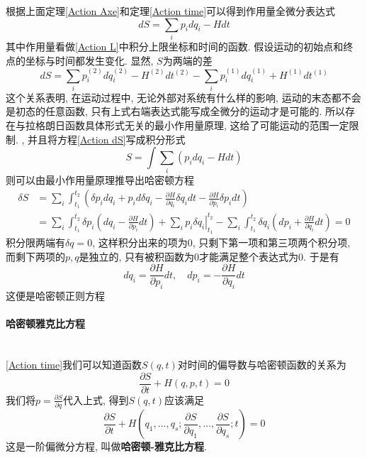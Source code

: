 \documentclass[a4paper,11pt]{article}
\theoremstyle{mystyle}
\begin{document}
根据上面定理\ref{Action Axe}和定理\ref{Action time}可以得到作用量全微分表达式
\begin{equation}\label{Action dS}
  dS=\sum_{i}p_idq_i-Hdt
\end{equation}
其中作用量看做\eqref{Action L}中积分上限坐标和时间的函数. 假设运动的初始点和终点的坐标与时间都发生变化. 显然, $S$为两端的差
\begin{equation*}
  dS=\sum_{i}p_i^{(2)}dq_i^{(2)}-H^{(2)}dt^{(2)}-\sum_{i}p_i^{(1)}dq_i^{(1)}+H^{(1)}dt^{(1)}
\end{equation*}
这个关系表明, 在运动过程中, 无论外部对系统有什么样的影响, 运动的末态都不会是初态的任意函数, 只有上式右端表达式能写成全微分的运动才是可能的. 所以存在与拉格朗日函数具体形式无关的最小作用量原理, 这给了可能运动的范围一定限制.
, 并且将方程\eqref{Action dS}写成积分形式
\begin{equation}\label{Action int}
  S=\int\sum_{i}\left(p_idq_i-Hdt\right)
\end{equation}
则可以由最小作用量原理推导出哈密顿方程
\begin{equation*}
\begin{split}
   \delta S&=\sum_{i}\int_{t_1}^{t_2}\left(\delta p_idq_i+p_id\delta q_i-\frac{\partial H}{\partial{q_i}}\delta q_idt-\frac{\partial H}{\partial p_i}\delta p_idt\right) \\
     &=\sum_{i}\int_{t_1}^{t_2}\delta p_i\left(dq_i-\frac{\partial H}{\partial{p_i}}dt\right)+\left.\sum_{i}p_i\delta q_i\right|_{t_1}^{t_2}-\sum_{i}\int_{t_1}^{t_2}\delta q_i\left(dp_i+\frac{\partial H}{\partial{q_i}}dt\right)=0
\end{split}
\end{equation*}
积分限两端有$\delta q=0$, 这样积分出来的项为$0$, 只剩下第一项和第三项两个积分项, 而剩下两项的$p,q$是独立的, 只有被积函数为$0$才能满足整个表达式为$0$. 于是有
\begin{equation*}
  dq_i=\frac{\partial H}{\partial{p_i}}dt,\quad dp_i=-\frac{\partial H}{\partial{q_i}}dt
\end{equation*}
这便是哈密顿正则方程
\paragraph*{哈密顿雅克比方程}\quad\\
\ref{Action time}我们可以知道函数$S(q,t)$对时间的偏导数与哈密顿函数的关系为
\begin{equation*}
  \frac{\partial S}{\partial t}+H(q,p,t)=0
\end{equation*}
我们将$p=\frac{\partial S}{\partial q}$代入上式, 得到$S(q,t)$应该满足
\begin{equation*}
  \frac{\partial S}{\partial t}+H(q_1,\dots,q_s;\frac{\partial S}{\partial{q_1}},\dots,\frac{\partial S}{\partial{q_s}};t)=0
\end{equation*}
这是一阶偏微分方程, 叫做\textbf{哈密顿-雅克比方程}.
\end{document}
